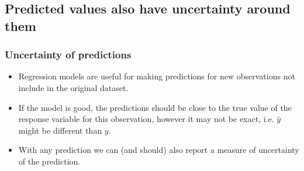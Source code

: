 \documentclass[11pt,containsverbatim,handout,xcolor=xelatex,dvipsnames,table]{beamer}
\begin{document}

\subsection{Predicted values also have uncertainty around them}
\label{mi2}


\begin{frame}
\frametitle{Uncertainty of predictions}

\begin{itemize}

\item Regression models are useful for making predictions for new observations not include in the original dataset.

\pause

\item If the model is good, the predictions should be close to the true value of the response variable for this observation, 
however it may not be exact, i.e. $\hat{y}$ might be different than $y$.

\pause

\item With any prediction we can (and should) also report a measure of uncertainty of the prediction.

\end{itemize}

\end{frame}

\end{document}
